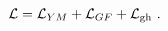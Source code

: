 \begin{equation}
 {\cal{L}} ={\cal{L}}_{YM} + {\cal{L}}_{GF}+{\cal{L}}_{{\rm gh}}~.     \label{eq:byuzonalti}      
\end{equation}

